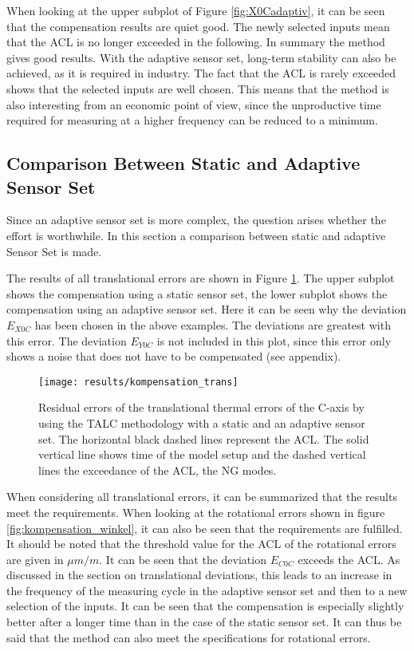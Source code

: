 When looking at the upper subplot of Figure \ref{fig:X0Cadaptiv}, it can be seen that the compensation results are quiet good. The newly selected inputs mean that the ACL is no longer exceeded in the following. In summary the method gives good results. With the adaptive sensor set, long-term stability can also be achieved, as it is required in industry. The fact that the ACL is rarely exceeded shows that the selected inputs are well chosen. This means that the method is also interesting from an economic point of view, since the unproductive time required for measuring at a higher frequency can be reduced to a minimum.

\subsection{Comparison Between Static and Adaptive Sensor Set}
\label{sec:comparison_static_adaptive}

Since an adaptive sensor set is more complex, the question arises whether the effort is worthwhile. In this section a comparison between static and adaptive Sensor Set is made.

The results of all translational errors are shown in Figure \ref{fig:kompensation_trans}. The upper subplot shows the compensation using a static sensor set, the lower subplot shows the compensation using an adaptive sensor set. Here it can be seen why the deviation $E_{X0C}$ has been chosen in the above examples. The deviations are greatest with this error. The deviation $ E_{Y0C}$ is not included in this plot, since this error only shows a noise that does not have to be compensated (see appendix).

\begin{figure}[!htb]
    \centering
    \texttt{[image: results/kompensation\_trans]} %
    \caption[All translational deviations]{Residual errors of the translational thermal errors of the C-axis by using the TALC methodology with a static and an adaptive sensor set. The horizontal black dashed lines represent the ACL. The solid vertical line shows time of the model setup and the dashed vertical lines the exceedance of the ACL, the NG modes.}
    \label{fig:kompensation_trans}
\end{figure}

When considering all translational errors, it can be summarized that the results meet the requirements. When looking at the rotational errors shown in figure \ref{fig:kompensation_winkel}, it can also be seen that the requirements are fulfilled. It should be noted that the threshold value for the ACL of the rotational errors are given in $\mu m/m$. It can be seen that the deviation $E_{C0C}$ exceeds the ACL. As discussed in the section on translational deviations, this leads to an increase in the frequency of the measuring cycle in the adaptive sensor set and then to a new selection of the inputs. It can be seen that the compensation is especially slightly better after a longer time than in the case of the static sensor set. It can thus be said that the method can also meet the specifications for rotational errors.


